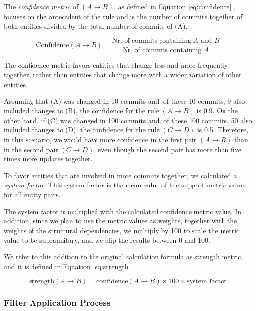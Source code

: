 \documentclass{ieeeaccess}
\begin{document}
The \textit{confidence metric} of $(A \rightarrow B)$, as defined in Equation \eqref{eq:confidence} , focuses on the antecedent of the rule and is the number of commits together of both entities divided by the total number of commits of (A).


\begin{equation}
\text{Confidence}(A \rightarrow B) = \frac{\text{Nr. of commits containing } A \text{ and } B}{\text{Nr. of commits containing } A}
\label{eq:confidence}
\end{equation}


The confidence metric favors entities that change less and more frequently together, rather than entities that change more with a wider variation of other entities.

Assuming that (A) was changed in 10 commits and, of these 10 commits, 9 also included changes to (B), the confidence for the rule $(A \rightarrow B)$ is 0.9. On the other hand, if (C) was changed in 100 commits and, of these 100 commits, 50 also included changes to (D), the confidence for the rule $(C \rightarrow D)$ is 0.5. Therefore, in this scenario, we would have more confidence in the first pair $(A \rightarrow B)$ than in the second pair $(C \rightarrow D)$, even though the second pair has more than five times more updates together.

To favor entities that are involved in more commits together, we calculated a \textit{system factor}. This system factor is the mean value of the support metric values for all entity pairs.

The system factor is multiplied with the calculated confidence metric value. In addition, since we plan to use the metric values as weights, together with the weights of the structural dependencies, we multiply by 100 to scale the metric value to be supraunitary, and we clip the results between 0 and 100.


We refer to this addition to the original calculation formula as strength metric, and it is defined in Equation \eqref{eq:strength}.

\begin{equation}
\text{strength}(A \rightarrow B) = \text{confidence}(A \rightarrow B) \times 100 \times \text{system factor} 
\label{eq:strength}
\end{equation}


\subsubsection{Filter Application Process}
\end{document}
